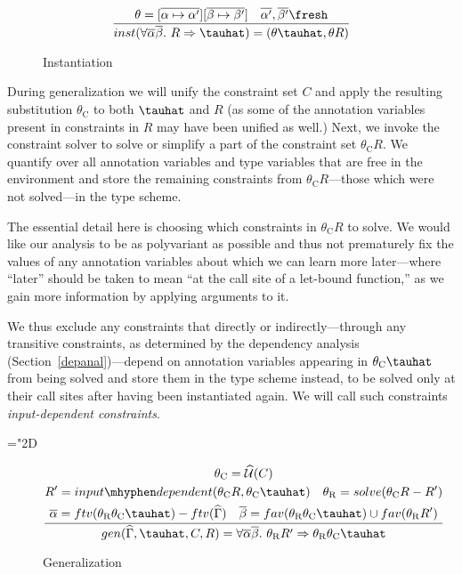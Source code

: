 \begin{figure}[h!t]
\[ \frac{\theta = [\overline{\alpha \mapsto \alpha'}][\overline{\beta \mapsto \beta'}] \quad \overline{\alpha'},\overline{\beta'} \fresh }{inst(\forall \overline{\alpha}\overline{\beta}.\ R \Rightarrow \tauhat) = (\theta\tauhat, \theta R)} \]
\caption{Instantiation}
\end{figure}

During generalization we will unify the constraint set $C$ and apply the resulting substitution $\theta_\mathrm{C}$ to both $\tauhat$ and $R$ (as some of the annotation variables present in constraints in $R$ may have been unified as well.) Next, we invoke the constraint solver to solve or simplify a part of the constraint set $\theta_\mathrm{C} R$. We quantify over all annotation variables and type variables that are free in the environment and store the remaining constraints from $\theta_\mathrm{C} R$---those which were not solved---in the type scheme.

The essential detail here is choosing which constraints in $\theta_\mathrm{C} R$ to solve. We would like our analysis to be as polyvariant as possible and thus not prematurely fix the values of any annotation variables about which we can learn more later---where ``later'' should be taken to mean ``at the call site of a let-bound function,'' as we gain more information by applying arguments to it.

We thus exclude any constraints that directly or indirectly---through any transitive constraints, as determined by the dependency analysis (Section~\ref{depanal})---depend on annotation variables appearing in $\theta_\mathrm{C} \tauhat$ from being solved and store them in the type scheme instead, to be solved only at their call sites after having been instantiated again. We will call such constraints \emph{input-dependent constraints}.

\mathchardef\mhyphen="2D

\begin{figure}[h!t]
\[ \frac{\begin{gathered}\theta_\mathrm{C} = \widehat{\mathcal{U}}(C) \\ R' = input\mhyphen dependent(\theta_\mathrm{C} R, \theta_\mathrm{C} \tauhat)\quad \theta_\mathrm{R} = solve(\theta_\mathrm{C}R - R') \\ \overline{\alpha} = ftv(\theta_\mathrm{R}\theta_\mathrm{C}\tauhat) - ftv(\widehat\Gamma) \quad \overline{\beta} = fav(\theta_\mathrm{R}\theta_\mathrm{C}\tauhat) \cup fav(\theta_\mathrm{R}R') \end{gathered}}{gen(\widehat\Gamma, \tauhat, C, R) = \forall \overline{\alpha}\overline{\beta}.\ \theta_\mathrm{R}R' \Rightarrow \theta_\mathrm{R}\theta_\mathrm{C}\tauhat} \]
\caption{Generalization}
\end{figure}


